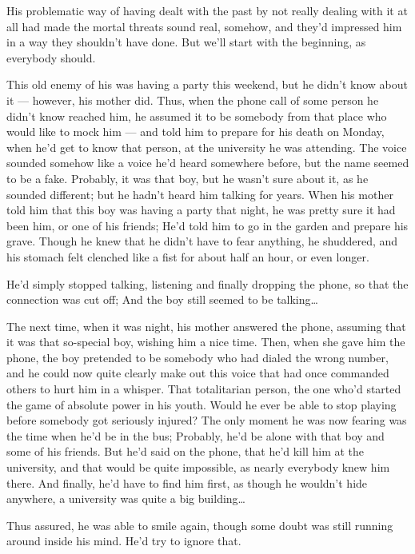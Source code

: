 His problematic way of having dealt with the past by not really dealing with it at all had made the mortal threats sound real, somehow, and they'd impressed him in a way they shouldn't have done. 
But we'll start with the beginning, as everybody should.

This old enemy of his was having a party this weekend, but he didn't know about it --- however, his mother did. Thus, when the phone call of some person he didn't know reached him, he assumed it to be somebody from that place who would like to mock him --- and told him to prepare for his death on Monday, when he'd get to know that person, at the university he was attending. The voice sounded somehow like a voice he'd heard somewhere before, but the name seemed to be a fake. Probably, it was that boy, but he wasn't sure about it, as he sounded different; but he hadn't heard him talking for years. When his mother told him that this boy was having a party that night, he was pretty sure it had been him, or one of his friends; He'd told him to go in the garden and prepare his grave. 
Though he knew that he didn't have to fear anything, he shuddered, and his stomach felt clenched like a fist for about half an hour, or even longer.

He'd simply stopped talking, listening and finally dropping the phone, so that the connection was cut off; And the boy still seemed to be talking\ldots

The next time, when it was night, his mother answered the phone, assuming that it was that so-special boy, wishing him a nice time. Then, when she gave him the phone, the boy pretended to be somebody who had dialed the wrong number, and he could now quite clearly make out this voice that had once commanded others to hurt him in a whisper. 
That totalitarian person, the one who'd started the game of absolute power in his youth. Would he ever be able to stop playing before somebody got seriously injured?
The only moment he was now fearing was the time when he'd be in the bus; Probably, he'd be alone with that boy and some of his friends. 
But he'd said on the phone, that he'd kill him at the university, and that would be quite impossible, as nearly everybody knew him there. And finally, he'd have to find him first, as though he wouldn't hide anywhere, a university was quite a big building\ldots

Thus assured, he was able to smile again, though some doubt was still running around inside his mind. 
He'd try to ignore that.


